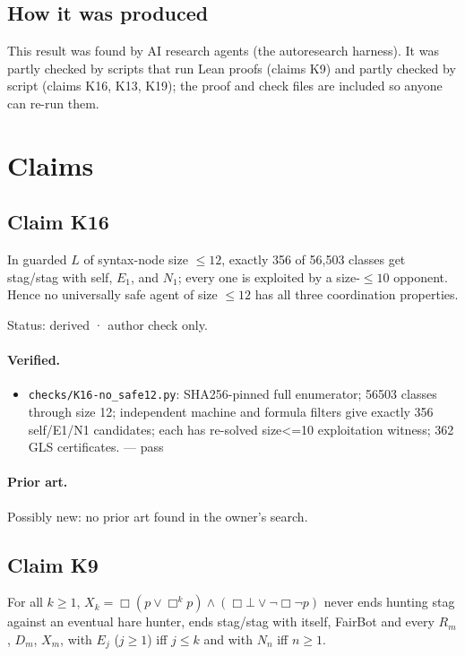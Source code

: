 \documentclass{article}
\begin{document}
\subsection*{How it was produced}

This result was found by AI research agents (the autoresearch harness). It was partly checked by scripts that run Lean proofs (claims K9) and partly checked by script (claims K16, K13, K19); the proof and check files are included so anyone can re-run them.

\section{Claims}

\subsection*{Claim K16}

In guarded $L$ of syntax-node size $\le12$, exactly 356 of 56,503 classes get stag/stag with self, $E_1$, and $N_1$; every one is exploited by a size-$\le10$ opponent. Hence no universally safe agent of size $\le12$ has all three coordination properties.

Status: derived · author check only.

\paragraph{Verified.}
\begin{itemize}
\item \texttt{checks/K16-no\_safe12.py}: SHA256-pinned full enumerator; 56503 classes through size 12; independent machine and formula filters give exactly 356 self/E1/N1 candidates; each has re-solved size\textless{}=10 exploitation witness; 362 GLS certificates. --- pass
\end{itemize}

\paragraph{Prior art.} Possibly new: no prior art found in the owner's search.

\subsection*{Claim K9}

For all $k\ge1$, $X_k=\Box(p\lor\Box^kp)\land(\Box\bot\lor\neg\Box\neg p)$ never ends hunting stag against an eventual hare hunter, ends stag/stag with itself, FairBot and every $R_m$, $D_m$, $X_m$, with $E_j$ ($j\ge1$) iff $j\le k$ and with $N_n$ iff $n\ge1$.
\end{document}
